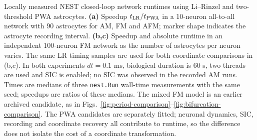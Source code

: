 Locally measured NEST closed-loop network runtimes using Li--Rinzel and two-threshold PWA astrocytes. \textbf{(a)} Speedup $t_{\rm LR}/t_{\rm PWA}$ in a 10-neuron all-to-all network with 90 astrocytes for AM, FM and AFM; marker shape indicates the astrocyte recording interval. \textbf{(b,c)} Speedup and absolute runtime in an independent 100-neuron FM network as the number of astrocytes per neuron varies. The same LR timing samples are used for both coordinate comparisons in (b,c). In both experiments $dt=0.1$ ms, biological duration is 60 s, two threads are used and SIC is enabled; no SIC was observed in the recorded AM runs. Times are medians of three \texttt{nest.Run} wall-time measurements with the same seed; speedups are ratios of these medians. The mixed FM model is an earlier archived candidate, as in Figs.~\ref{fig:period-comparison}--\ref{fig:bifurcation-comparison}. The PWA candidates are separately fitted; neuronal dynamics, SIC, recording and coordinate recovery all contribute to runtime, so the difference does not isolate the cost of a coordinate transformation.
